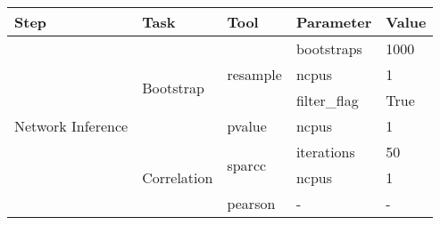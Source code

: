 \begin{table}[h]
\centering
\small
\begin{tabular}{lllll}
\hline
\textbf{Step}                             & \textbf{Task}                                            & \textbf{Tool}                          & \textbf{Parameter}                     & \textbf{Value}                                                                                           \\ \hline
\multirow{17}{*}{Network Inference}       & \multirow{4}{*}{Bootstrap}                               & \multirow{3}{*}{resample}              & bootstraps                             & 1000                                                                                                     \\
                                          &                                                          &                                        & ncpus                                  & 1                                                                                                        \\
                                          &                                                          &                                        & filter\_flag                           & True                                                                                                     \\
                                          &                                                          & pvalue                                 & ncpus                                  & 1                                                                                                        \\ \cline{2-5}
                                          & \multirow{12}{*}{Correlation}                            & \multirow{2}{*}{sparcc}                & iterations                             & 50                                                                                                       \\
                                          &                                                          &                                        & ncpus                                  & 1                                                                                                        \\
                                          &                                                          & pearson                                & -                                      & -                                                                                                        \\

\end{tabular}
\end{table}
